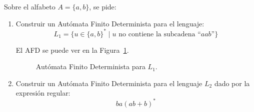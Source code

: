 \documentclass[12pt]{article}
\begin{document}
\begin{ejercicio}
    Sobre el alfabeto $A=\{a,b\}$, se pide:
    \begin{enumerate}
        \item Construir un Autómata Finito Determinista para el lenguaje:
            \begin{equation*}
                L_1 = \{u\in {\{a,b\}}^{\ast} \mid u \text{\ no contiene la subcadena ``} aab\text{''}\}
            \end{equation*}

            El AFD se puede ver en la Figura~\ref{fig:afd1}.
            \begin{figure}
                \centering
                \caption{Autómata Finito Determinista para $L_1$.}
                \label{fig:afd1}
            \end{figure}
        \item Construir un Autómata Finito Determinista para el lenguaje $L_2$ dado por la expresión regular:
            \begin{equation*}
                ba{(ab+b)}^{\ast}
            \end{equation*}


\end{enumerate}
\end{ejercicio}
\end{document}
